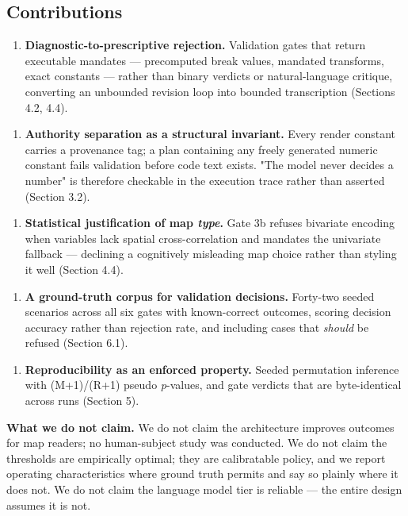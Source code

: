 \subsection{Contributions}
\begin{enumerate}\itemsep2pt
\item \textbf{Diagnostic-to-prescriptive rejection.} Validation gates that return executable mandates --- precomputed break values, mandated transforms, exact constants --- rather than binary verdicts or natural-language critique, converting an unbounded revision loop into bounded transcription (Sections 4.2, 4.4).
\end{enumerate}
\begin{enumerate}\itemsep2pt
\item \textbf{Authority separation as a structural invariant.} Every render constant carries a provenance tag; a plan containing any freely generated numeric constant fails validation before code text exists. "The model never decides a number" is therefore checkable in the execution trace rather than asserted (Section 3.2).
\end{enumerate}
\begin{enumerate}\itemsep2pt
\item \textbf{Statistical justification of map \emph{type}.} Gate 3b refuses bivariate encoding when variables lack spatial cross-correlation and mandates the univariate fallback --- declining a cognitively misleading map choice rather than styling it well (Section 4.4).
\end{enumerate}
\begin{enumerate}\itemsep2pt
\item \textbf{A ground-truth corpus for validation decisions.} Forty-two seeded scenarios across all six gates with known-correct outcomes, scoring decision accuracy rather than rejection rate, and including cases that \emph{should} be refused (Section 6.1).
\end{enumerate}
\begin{enumerate}\itemsep2pt
\item \textbf{Reproducibility as an enforced property.} Seeded permutation inference with (M+1)/(R+1) pseudo \emph{p}-values, and gate verdicts that are byte-identical across runs (Section 5).
\end{enumerate}
\textbf{What we do not claim.} We do not claim the architecture improves outcomes for map readers; no human-subject study was conducted. We do not claim the thresholds are empirically optimal; they are calibratable policy, and we report operating characteristics where ground truth permits and say so plainly where it does not. We do not claim the language model tier is reliable --- the entire design assumes it is not.

